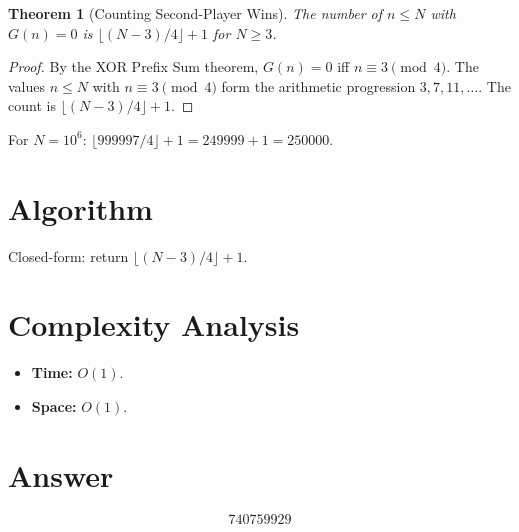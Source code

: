 \documentclass[11pt]{article}
\newtheorem{theorem}{Theorem}
\theoremstyle{definition}
\begin{document}
\begin{theorem}[Counting Second-Player Wins]
The number of $n \leq N$ with $G(n) = 0$ is $\lfloor(N-3)/4\rfloor + 1$ for $N \geq 3$.
\end{theorem}

\begin{proof}
By the XOR Prefix Sum theorem, $G(n) = 0$ iff $n \equiv 3 \pmod{4}$. The values $n \leq N$ with $n \equiv 3 \pmod{4}$ form the arithmetic progression $3, 7, 11, \ldots$. The count is $\lfloor(N-3)/4\rfloor + 1$.
\end{proof}

For $N = 10^6$: $\lfloor 999997/4 \rfloor + 1 = 249999 + 1 = 250000$.

\section{Algorithm}

Closed-form: return $\lfloor(N-3)/4\rfloor + 1$.

\section{Complexity Analysis}

\begin{itemize}
    \item \textbf{Time:} $O(1)$.
    \item \textbf{Space:} $O(1)$.
\end{itemize}

\section{Answer}

\[
\boxed{740759929}
\]
\end{document}

